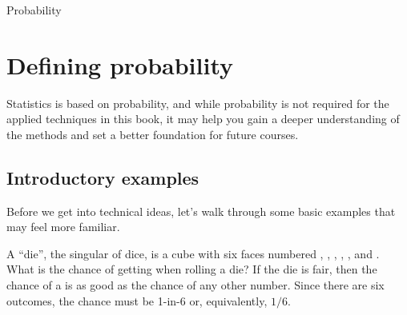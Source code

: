 \begin{chapterpage}{Probability}
  \label{probability}
  \label{ch_probability}
\end{chapterpage}
\renewcommand{\chapterfolder}{ch_probability}







\section{Defining probability}
\label{basicsOfProbability}

Statistics is based on probability,
and while probability is not required for the applied
techniques in this book, it may help you gain a deeper
understanding of the methods and set a better foundation
for future courses.


\subsection{Introductory examples}

Before we get into technical ideas, let's walk through
some basic examples that may feel more familiar.

\begin{examplewrap}
\begin{nexample}{A ``die'', the singular of dice, is a cube with six faces numbered , , , , , and . What is the chance of getting  when rolling a die?}\label{probOf1}
If the die is fair, then the chance of a  is as good as the chance of any other number. Since there are six outcomes, the chance must be 1-in-6 or, equivalently, $1/6$.
\end{nexample}
\end{examplewrap}

